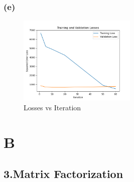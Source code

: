 \documentclass{article}
\begin{document}
\subsubsection*{(e)}
\begin{figure}[h]
\centering
\includegraphics[width=0.5\textwidth]{losses vs iteration.png}
\caption{Losses vs Iteration}
\end{figure}



\section*{B}
\subsection*{3.Matrix Factorization}
\end{document}
